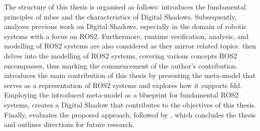 The structure of this thesis is organised as follows:\newline
{} introduces the fundamental principles of \acl{mbse} and the characteristics of Digital Shadows. 
Subsequently,  analyses previous work on Digital Shadows, especially in the domain of robotic systems with a focus on ROS2. Furthermore, runtime verification, analysis, and modelling of ROS2 systems are also considered as they mirror related topics. 
 then delves into the modelling of ROS2 systems, covering various concepts ROS2 encompasses, thus marking the commencement of the author's contribution.
 introduces the main contribution of this thesis by presenting the meta-model that serves as a representation of ROS2 systems and explores how it supports \acl{fdd}. 
Employing the introduced meta-model as a blueprint for fundamental ROS2 systems,  creates a Digital Shadow that contributes to the objectives of this thesis. 
Finally,  evaluates the proposed approach, followed by , which concludes the thesis and outlines directions for future research.